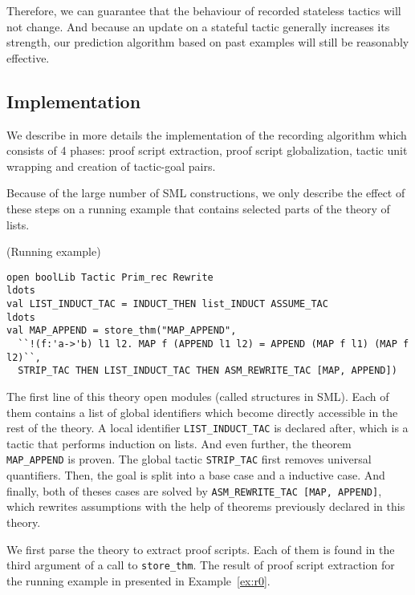 \documentclass[runningheads,a4paper,draft]{svjour3}
\def\sml{\textsf{SML}\xspace}
\begin{document}
Therefore, we can guarantee that the behaviour of recorded stateless tactics 
will not change. And because an update on a stateful tactic 
generally increases its strength, our prediction algorithm based on past 
examples will still be reasonably effective. 


\subsection{Implementation}
We describe in more details the implementation of the recording algorithm which 
consists of 4 phases: proof script extraction, proof script globalization, 
tactic unit wrapping and creation of tactic-goal pairs.

Because of the large number of \sml constructions, we only describe the effect 
of these steps on a running example that contains selected parts of the theory
of lists.


\begin{example}\label{ex:running}(Running example)
\small
\begin{lstlisting}[language=SMLSmall]
open boolLib Tactic Prim_rec Rewrite
ldots
val LIST_INDUCT_TAC = INDUCT_THEN list_INDUCT ASSUME_TAC
ldots
val MAP_APPEND = store_thm("MAP_APPEND",
  ``!(f:'a->'b) l1 l2. MAP f (APPEND l1 l2) = APPEND (MAP f l1) (MAP f l2)``,
  STRIP_TAC THEN LIST_INDUCT_TAC THEN ASM_REWRITE_TAC [MAP, APPEND])
\end{lstlisting}
\end{example} 

The first line of this theory open modules (called structures in \sml). Each of 
them contains a list of global identifiers which become directly accessible in 
the rest of the theory.
A local identifier \texttt{LIST\_INDUCT\_TAC} is declared after, which is a 
tactic that performs induction on lists. And even further, the theorem 
\texttt{MAP\_APPEND} is proven.
The global tactic \texttt{STRIP\_TAC} first removes universal quantifiers. Then,
the goal is split into a base case and a inductive case. And finally, both of 
theses cases are solved by \texttt{ASM\_REWRITE\_TAC [MAP, APPEND]}, which 
rewrites assumptions with the help of theorems previously declared in this 
theory. 

We first parse the theory to extract proof scripts. Each of them is found in 
the third argument of a call to \texttt{store\_thm}. The result of proof script 
extraction for the running example in presented in Example~\ref{ex:r0}.
\end{document}

